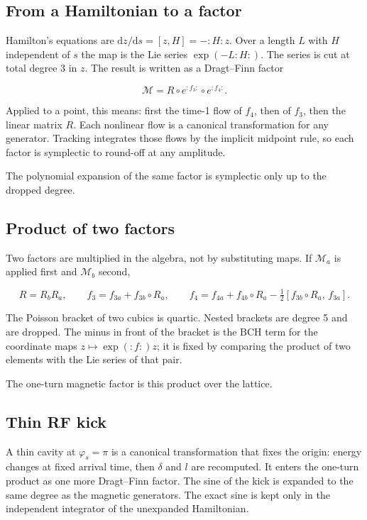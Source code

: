 \documentclass[11pt,a4paper]{article}
\begin{document}
\subsection{From a Hamiltonian to a factor}

Hamilton's equations are $\mathrm{d}z/\mathrm{d}s=[z,H]=-:H:z$. Over a
length $L$ with $H$ independent of $s$ the map is the Lie series
$\exp(-L:H:)$. The series is cut at total degree 3 in $z$. The result is
written as a Dragt–Finn factor

\[
\mathcal{M}=R\circ e^{:f_3:}\circ e^{:f_4:}.
\]

Applied to a point, this means: first the time-1 flow of $f_4$, then of
$f_3$, then the linear matrix $R$. Each nonlinear flow is a canonical
transformation for any generator. Tracking integrates those flows by the
implicit midpoint rule, so each factor is symplectic to round-off at any
amplitude.

The polynomial expansion of the same factor is symplectic only up to the
dropped degree.

\subsection{Product of two factors}

Two factors are multiplied in the algebra, not by substituting maps. If
$\mathcal{M}_a$ is applied first and $\mathcal{M}_b$ second,

\[
R=R_b R_a,\qquad
f_3=f_{3a}+f_{3b}\circ R_a,\qquad
f_4=f_{4a}+f_{4b}\circ R_a-\tfrac12[f_{3b}\circ R_a,\,f_{3a}].
\]

The Poisson bracket of two cubics is quartic. Nested brackets are degree 5
and are dropped. The minus in front of the bracket is the BCH term for the
coordinate maps $z\mapsto\exp(:f:)z$; it is fixed by comparing the product
of two elements with the Lie series of that pair.

The one-turn magnetic factor is this product over the lattice.

\subsection{Thin RF kick}

A thin cavity at $\varphi_s=\pi$ is a canonical transformation that fixes
the origin: energy changes at fixed arrival time, then $\delta$ and $l$
are recomputed. It enters the one-turn product as one more Dragt–Finn
factor. The sine of the kick is expanded to the same degree as the magnetic
generators. The exact sine is kept only in the independent integrator of the
unexpanded Hamiltonian.
\end{document}
